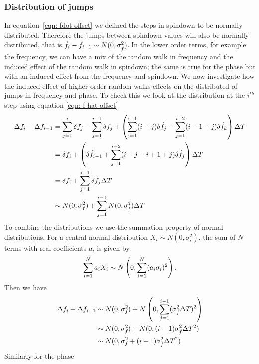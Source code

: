 \subsubsection{Distribution of jumps}
In equation~\eqref{eqn: fdot offset}  we defined the steps in spindown to be
normally distributed. Therefore the jumps between spindown values will also be
normally distributed, that is $\dot{f}_{i} - \dot{f}_{i-1} \sim N(0, \sigma_{\dot{f}}^{2})$. In
the lower order terms, for example the frequency, we can have a mix of the
random walk in frequency and the induced effect of the random walk in spindown;
the same is true for the phase but with an induced effect from the frequency
and spindown.  We now investigate how the induced effect of higher order random
walks effects on the distributed of jumps in frequency and phase. To check this
we  look at the distribution at the $i^{th}$ step using equation 
\eqref{eqn: f hat offset}
\begin{align}
\Delta f_{i} - \Delta f_{i-1} & = \sum_{j=1}^{i}\delta f_{j}
-  \sum_{j=1}^{i-1}\delta f_{j} + \left(\sum_{j=1}^{i-1}(i-j)\delta \dot{f}_{j}  
-  \sum_{j=1}^{i-2}(i-1-j)\delta \dot{f}_{k} \right)\Delta T  \\
& = \delta f_{i} + \left(\delta \dot{f}_{i-1} 
+ \sum_{j=1}^{i-2}(i-j-i+1+j)\delta \dot{f}_{j}\right)\Delta T \\
& = \delta f_{i} + \sum_{j=1}^{i-1}\delta \dot{f}_{j} \Delta T \\
& \sim N(0, \sigma_{f}^{2}) + \sum_{j=1}^{i-1}N(0, \sigma_{\dot{f}}^{2}) \Delta T 
\end{align}
To combine the distributions we use the summation property of normal
distributions. For a central normal distribution $X_{i}\sim N(0,
\sigma_{i}^{2})$, the sum of $N$ terms with real coefficients $a_{i}$ is given
by 
\begin{equation}
\sum_{i=1}^{N}a_{i}X_{i} \sim N\left(0, \sum_{i=1}^{N}(a_{i}\sigma_{i})^{2}\right).
\end{equation}
Then we have
\begin{align}
\Delta f_{i} - \Delta f_{i-1} & \sim N(0, \sigma_{f}^{2}) 
+ N\left(0, \sum_{j=1}^{i-1}(\sigma_{\dot{f}}^{2}\Delta T)^{2}\right) \\
& \sim N(0, \sigma_{f}^{2}) + N(0, (i-1)\sigma_{\dot{f}}^{2}\Delta T^{2}) \\
& \sim N(0, \sigma_{f}^{2} + (i-1)\sigma_{\dot{f}}^{2}\Delta T^2)  
\end{align}
Similarly for the phase 
